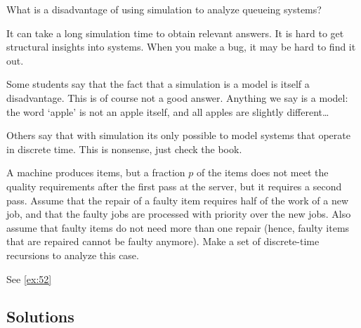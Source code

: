 \begin{exercise}[201807]{1}
  What is a disadvantage of using simulation to analyze queueing systems?
  \begin{solution}
    It can take a long simulation time to obtain relevant answers. It is hard to get structural insights into systems. When you make a bug, it may be hard to find it out.

Some students say that the fact that a simulation is a model is itself a disadvantage. This is of course not a good answer. Anything we say is a model: the word `apple' is not an apple itself, and all apples are slightly different\ldots 

Others say that with simulation its only possible to model systems that operate in discrete time. This is nonsense, just check the book. 
  \end{solution}
\end{exercise}


\begin{exercise}[201904, 2]
  A machine produces items, but a fraction $p$ of the items does not meet the quality requirements after the first pass at the server, but it requires a second pass.
  Assume that the repair of a faulty item requires half of the work of a new job, and that the faulty jobs are processed with priority over the new jobs.
  Also assume that faulty items do not need more than one repair (hence, faulty items that are repaired cannot be faulty anymore).
  Make a set of discrete-time recursions to analyze this case.
\begin{solution}
See \ref{ex:52}
\end{solution}
\end{exercise}


\subsection*{Solutions}




